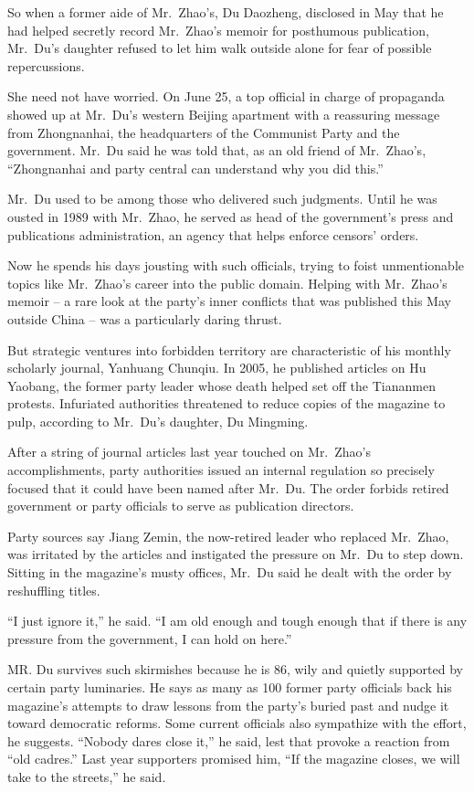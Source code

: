 ﻿\documentclass[12pt]{article}
\begin{document}
So when a former aide of Mr.~Zhao's, Du Daozheng, disclosed in May that he had helped secretly
record Mr.~Zhao's memoir for posthumous publication, Mr.~Du's daughter refused to let him walk
outside alone for fear of possible repercussions.

She need not have worried. On June 25, a top official in charge of propaganda showed up at Mr.~Du's
western Beijing apartment with a reassuring message from Zhongnanhai, the headquarters of the
Communist Party and the government. Mr.~Du said he was told that, as an old friend of Mr.~Zhao's,
``Zhongnanhai and party central can understand why you did this.''

Mr.~Du used to be among those who delivered such judgments. Until he was ousted in 1989 with
Mr.~Zhao, he served as head of the government's press and publications administration, an agency
that helps enforce censors' orders.

Now he spends his days jousting with such officials, trying to foist unmentionable topics like
Mr.~Zhao's career into the public domain. Helping with Mr.~Zhao's memoir -- a rare look at the
party's inner conflicts that was published this May outside China -- was a particularly daring
thrust.

But strategic ventures into forbidden territory are characteristic of his monthly scholarly journal,
Yanhuang Chunqiu. In 2005, he published articles on Hu Yaobang, the former party leader whose death
helped set off the Tiananmen protests. Infuriated authorities threatened to reduce copies of the
magazine to pulp, according to Mr.~Du's daughter, Du Mingming.

After a string of journal articles last year touched on Mr.~Zhao's accomplishments, party
authorities issued an internal regulation so precisely focused that it could have been named after
Mr.~Du. The order forbids retired government or party officials to serve as publication directors.

Party sources say Jiang Zemin, the now-retired leader who replaced Mr.~Zhao, was irritated by the
articles and instigated\cite{instigate} the pressure on Mr.~Du to step down. Sitting in the
magazine's musty offices, Mr.~Du said he dealt with the order by reshuffling titles.

``I just ignore it,'' he said. ``I am old enough and tough enough that if there is any pressure from
the government, I can hold on here.''

MR. Du survives such skirmishes because he is 86, wily and quietly supported by certain party
luminaries. He says as many as 100 former party officials back his magazine's attempts to draw
lessons from the party's buried past and nudge it toward democratic reforms. Some current officials
also sympathize with the effort, he suggests. ``Nobody dares close it,'' he said, lest that provoke
a reaction from ``old cadres.'' Last year supporters promised him, ``If the magazine closes, we will
take to the streets,'' he said.
\end{document}
